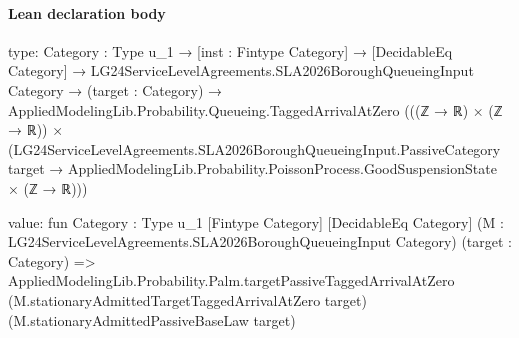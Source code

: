 \documentclass[10pt]{article}
\begin{document}
\paragraph{Lean declaration body}
\begin{ReviewVerbatim}
type:
{Category : Type u_1} →
  [inst : Fintype Category] →
    [DecidableEq Category] →
      LG24ServiceLevelAgreements.SLA2026BoroughQueueingInput Category →
        (target : Category) →
          AppliedModelingLib.Probability.Queueing.TaggedArrivalAtZero
            (((ℤ → ℝ) × (ℤ → ℝ)) ×
              (LG24ServiceLevelAgreements.SLA2026BoroughQueueingInput.PassiveCategory target →
                AppliedModelingLib.Probability.PoissonProcess.GoodSuspensionState × (ℤ → ℝ)))

value:
fun {Category : Type u_1} [Fintype Category] [DecidableEq Category]
    (M : LG24ServiceLevelAgreements.SLA2026BoroughQueueingInput Category) (target : Category) =>
  AppliedModelingLib.Probability.Palm.targetPassiveTaggedArrivalAtZero
    (M.stationaryAdmittedTargetTaggedArrivalAtZero target) (M.stationaryAdmittedPassiveBaseLaw target)
\end{ReviewVerbatim}
\end{document}
